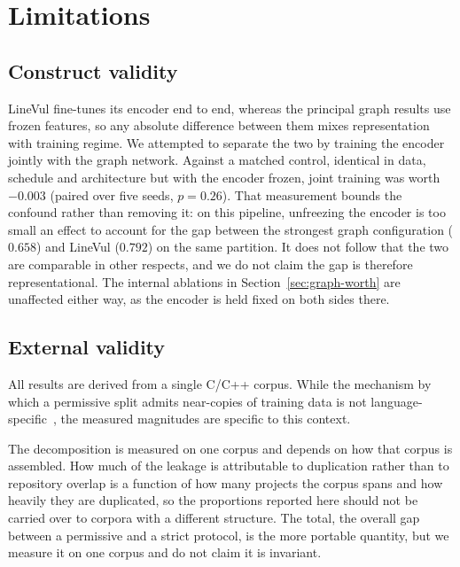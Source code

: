 \section{Limitations}
\label{sec:threats}

\subsection{Construct validity}
LineVul fine-tunes its encoder end to end, whereas the principal graph results
use frozen features, so any absolute difference between them mixes
representation with training regime. We attempted to separate the two by training the encoder jointly with the graph network. Against a matched control, identical in data, schedule and architecture but with the encoder frozen, joint training was worth $-0.003$ (paired over five seeds, $p=0.26$). That measurement bounds the confound rather than removing it: on this pipeline, unfreezing the encoder is too small an effect to account for the gap between the strongest graph configuration ($0.658$) and LineVul ($0.792$) on the same partition. It does not follow that the two are comparable in other respects, and we do not claim the gap is therefore representational. The
internal ablations in Section~\ref{sec:graph-worth} are unaffected either way,
as the encoder is held fixed on both sides there.

\subsection{External validity}
All results are derived from a single C/C++ corpus. While the mechanism by which a permissive split admits near-copies of training data is not language-specific~\citep{allamanis2019adverse}, the measured magnitudes are specific to this context.

The decomposition is measured on one corpus and depends on how that corpus is assembled. How much of the leakage is attributable to duplication rather than to repository overlap is a function of how many projects the corpus spans and how heavily they are duplicated, so the proportions reported here should not be carried over to corpora with a different structure. The total, the overall gap between a permissive and a strict protocol, is the more portable quantity, but we measure it on one corpus and do not claim it is invariant.

